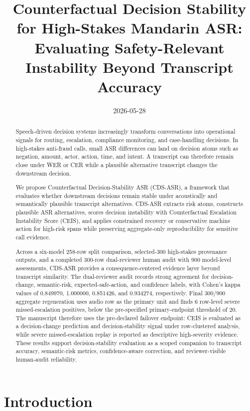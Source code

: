 \documentclass[
]{article}
\title{Counterfactual Decision Stability for High-Stakes Mandarin ASR:
Evaluating Safety-Relevant Instability Beyond Transcript Accuracy}
\author{}
\date{2026-05-28}
\begin{document}
\sloppy
\maketitle
\begin{abstract}
Speech-driven decision systems increasingly transform conversations into
operational signals for routing, escalation, compliance monitoring, and
case-handling decisions. In high-stakes anti-fraud calls, small ASR
differences can land on decision atoms such as negation, amount, actor,
action, time, and intent. A transcript can therefore remain close under
WER or CER while a plausible alternative transcript changes the
downstream decision.

We propose Counterfactual Decision-Stability ASR (CDS-ASR), a framework
that evaluates whether downstream decisions remain stable under
acoustically and semantically plausible transcript alternatives. CDS-ASR
extracts risk atoms, constructs plausible ASR alternatives, scores
decision instability with Counterfactual Escalation Instability Score
(CEIS), and applies constrained recovery or conservative machine action
for high-risk spans while preserving aggregate-only reproducibility for
sensitive call evidence.

Across a six-model 258-row split comparison, selected-300 high-stakes
provenance outputs, and a completed 300-row dual-reviewer human audit
with 900 model-level assessments, CDS-ASR provides a
consequence-centered evidence layer beyond transcript similarity. The
dual-reviewer audit records strong agreement for decision-change,
semantic-risk, expected-safe-action, and confidence labels, with Cohen's
kappa values of 0.849970, 1.000000, 0.851426, and 0.934274,
respectively. Final 300/900 aggregate regeneration uses audio row as the
primary unit and finds 6 row-level severe missed-escalation positives,
below the pre-specified primary-endpoint threshold of 20. The manuscript
therefore uses the pre-declared failover endpoint: CEIS is evaluated as
a decision-change prediction and decision-stability signal under
row-clustered analysis, while severe missed-escalation replay is
reported as descriptive high-severity evidence. These results support
decision-stability evaluation as a scoped companion to transcript
accuracy, semantic-risk metrics, confidence-aware correction, and
reviewer-visible human-audit reliability.
\end{abstract}

\hypertarget{introduction}{%
\section{Introduction}\label{introduction}}
\end{document}
